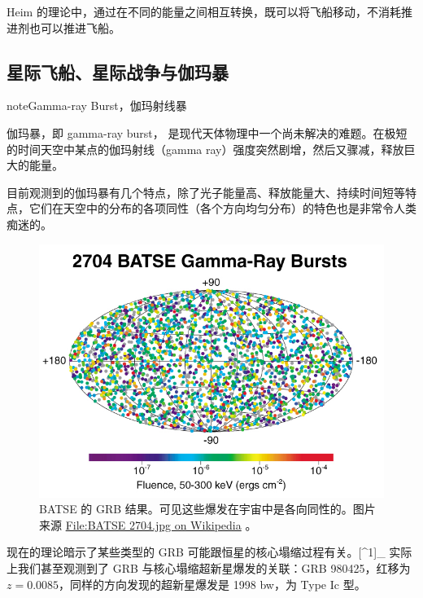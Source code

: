 \documentclass[letterpaper,10pt,english]{sphinxmanual}
\begin{document}
Heim 的理论中，通过在不同的能量之间相互转换，既可以将飞船移动，不消耗推进剂也可以推进飞船。


\subsection{星际飞船、星际战争与伽玛暴}
\label{physics:index-5}\label{physics:id11}
\begin{notice}{note}{Gamma-ray Burst，伽玛射线暴}

伽玛暴，即 gamma-ray burst， 是现代天体物理中一个尚未解决的难题。在极短的时间天空中某点的伽玛射线（gamma ray）强度突然剧增，然后又骤减，释放巨大的能量。

目前观测到的伽玛暴有几个特点，除了光子能量高、释放能量大、持续时间短等特点，它们在天空中的分布的各项同性（各个方向均匀分布）的特色也是非常令人类痴迷的。
\begin{figure}[htbp]
\centering
\capstart

\includegraphics{GRB-BATSE-2704.jpg}
\caption{BATSE 的 GRB 结果。可见这些爆发在宇宙中是各向同性的。图片来源 \href{https://commons.wikimedia.org/wiki/File:BATSE\_2704.jpg}{File:BATSE 2704.jpg on Wikipedia} 。}\end{figure}

现在的理论暗示了某些类型的 GRB 可能跟恒星的核心塌缩过程有关。{[}\textasciicircum{}1{]}\_ 实际上我们甚至观测到了 GRB 与核心塌缩超新星爆发的关联：GRB 980425，红移为 $z = 0.0085$，同样的方向发现的超新星爆发是 1998 bw，为 Type Ic 型。
\end{notice}
\end{document}
